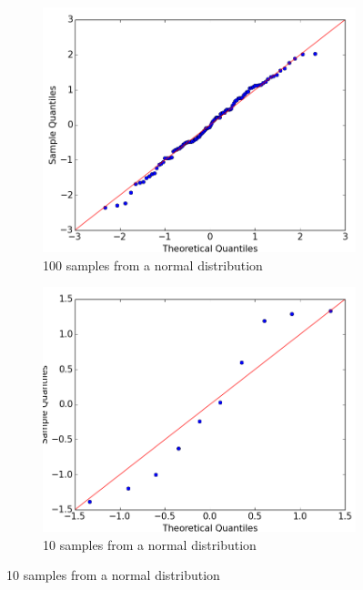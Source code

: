 \begin{figure}
\begin{subfigure}{0.38\textwidth}
\includegraphics[width=\linewidth]{figs/normality/100samples_random2.png}
\caption{100 samples from a normal distribution} \label{fig:normality_random100}
\end{subfigure}
\hspace*{\fill} %
\begin{subfigure}{0.38\textwidth}
\includegraphics[width=\linewidth]{figs/normality/10samples_random2.png}
\caption{10 samples from a normal distribution} \label{fig:normality_random}
\end{subfigure}


\end{figure}
